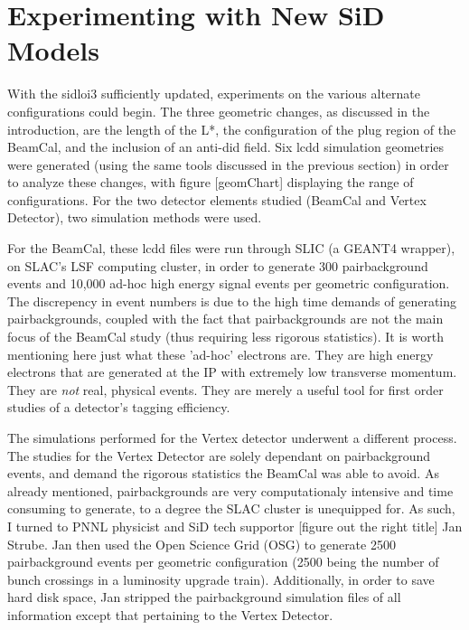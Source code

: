 \documentclass{report}
\begin{document}
        \section{Experimenting with New SiD Models}

            With the sidloi3 sufficiently updated, experiments on the various alternate configurations could begin. The three geometric changes, as discussed in the introduction, are the length of the L*, the configuration of the plug region of the BeamCal, and the inclusion of an anti-did field. Six lcdd simulation geometries were generated (using the same tools discussed in the previous section) in order to analyze these changes, with figure [geomChart] displaying the range of configurations. For the two detector elements studied (BeamCal and Vertex Detector), two simulation methods were used. 
            
            For the BeamCal, these lcdd files were run through SLIC (a GEANT4 wrapper), on SLAC's LSF computing cluster, in order to generate 300 pairbackground events and 10,000 ad-hoc high energy signal events per geometric configuration. The discrepency in event numbers is due to the high time demands of generating pairbackgrounds, coupled with the fact that pairbackgrounds are not the main focus of the BeamCal study (thus requiring less rigorous statistics). It is worth mentioning here just what these 'ad-hoc' electrons are. They are high energy electrons that are generated at the IP with extremely low transverse momentum. They are \textit{not} real, physical events. They are merely a useful tool for first order studies of a detector's tagging efficiency.

            The simulations performed for the Vertex detector underwent a different process. The studies for the Vertex Detector are solely dependant on pairbackground events, and demand the rigorous statistics the BeamCal was able to avoid. As already mentioned, pairbackgrounds are very computationaly intensive and time consuming to generate, to a degree the SLAC cluster is unequipped for. As such, I turned to PNNL physicist and SiD tech supportor [figure out the right title] Jan Strube. Jan then used the Open Science Grid (OSG) to generate 2500 pairbackground events per geometric configuration (2500 being the number of bunch crossings in a luminosity upgrade train). Additionally, in order to save hard disk space, Jan stripped the pairbackground simulation files of all information except that pertaining to the Vertex Detector. 
\end{document}
